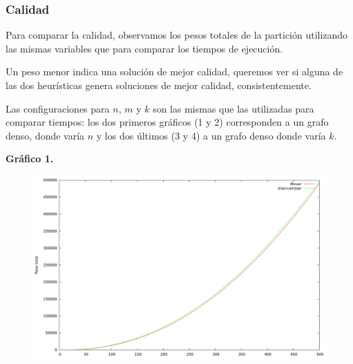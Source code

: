 \newpage \subsubsection{Calidad}

Para comparar la calidad, observamos los pesos totales de la partición
utilizando las mismas variables que para comparar los tiempos de ejecución.

Un peso menor indica una solución de mejor calidad, queremos ver si alguna
de las dos heurísticas genera soluciones de mejor calidad, consistentemente.

\vspace{0.25cm}

Las configuraciones para $n$, $m$ y $k$ son las mismas que las utilizadas para
comparar tiempos: los dos primeros gráficos (1 y 2) corresponden a un grafo denso, donde varía $n$ y los dos últimos (3 y 4) a un grafo denso donde varía $k$.

\vspace*{0.75cm}

\textbf{Gráfico 1.}
\begin{figure}[H]
  \begin{center}
    \includegraphics[scale=0.35]{imagenes/local-goloso-n-peso.png}
  \end{center}
\end{figure}

\newpage

